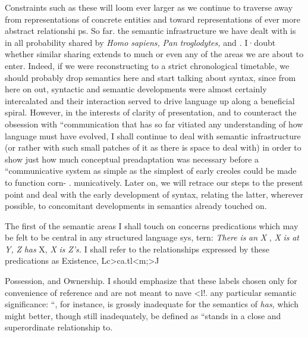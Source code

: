 Constraints such as these will loom ever larger as we continue to traverse  away from representations of concrete entities and toward representations of ever more abstract relationshi ps. So far. the semantic infrastructure we have dealt with is in all probability shared by \textit{Homo} \textit{sapiens,} \textit{Pan} \textit{troglodytes,} and \textit{.} I·doubt whether similar sharing extends to much or even any of the areas we are about to enter. Indeed, if we were reconstructing to a strict chrono\-logical timetable, we should probably drop semantics here and start talking about syntax, since from here on out, syntactic and semantic developments were almost certainly intercalated and their interaction served to drive language up along a beneficial spiral. However, in the interests of clarity of presentation, and to counteract the obsession with ``communication that has so far vitiated any understanding
of how language must have evolved, I shall continue to deal with semantic infrastructure (or rather with such small patches of it as there is space to deal with) in order to show just how much conceptual preadaptation was necessary before a ``communicative system as
simple as the simplest of early creoles could be made to function corn- . municatively. Later on, we will retrace our steps to the present point and deal with the early development of syntax, relating the latter, wherever possible, to concomitant developments in semantics already touched on.

The first of the semantic areas I shall touch on concerns predica\-tions which may be felt to be central in any structured language sys, tern: \textit{There }\textit{is} \textit{an} \textit{X} , \textit{X }\textit{is }\textit{at }\textit{Y,} \textit{Z }\textit{has} X, \textit{X }\textit{is} \textit{Z's. }I shall refer to the relationships expressed by these predications as Existence, Lc{\textgreater}ca.tl{\textless}m;{\textgreater}J

Possession, and Ownership. I should emphasize that these labels
chosen only for convenience of reference and are not meant to nave {\textless}l!. any particular semantic significance: ``, for instance, is grossly inadequate for the semantics of \textit{has,} which might better, though still inadequately, be defined as ``stands in a close and superordinate relationship to.{\textquotedbl}

